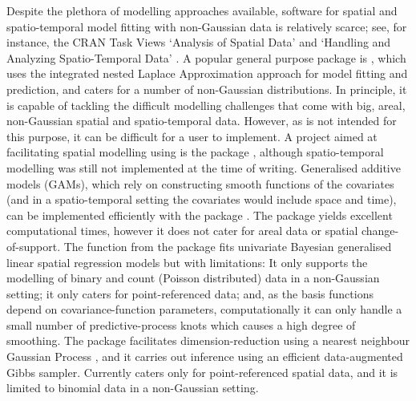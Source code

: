 \documentclass[article]{jss}
\newcommand{\fct}[1]{\code{#1()}}
\begin{document}
Despite the plethora of modelling approaches available, software for spatial and spatio-temporal model fitting with non-Gaussian data is relatively scarce; see, for instance, the CRAN Task Views `Analysis of Spatial Data' \citep{CRAN_Task_View:spatial} and `Handling and Analyzing Spatio-Temporal Data' \citep{CRAN_Task_View:spatio-temporal}. 
A popular general purpose  package is  \citep{Lindgren_2015_R-INLA}, which uses the integrated nested Laplace Approximation \citep{Rue_2009_INLA} approach for model fitting and prediction, and caters for a number of non-Gaussian distributions. 
In principle, it is capable of tackling the difficult modelling challenges that come with big, areal, non-Gaussian spatial and spatio-temporal data. However, as  is not intended for this purpose, it can be difficult for a user to implement. 
A project aimed at facilitating spatial modelling using  is the  package \citep{Bachl_2019_inlabru}, although spatio-temporal modelling was still not implemented at the time of writing.
Generalised additive models (GAMs), which rely on constructing smooth functions of the covariates (and in a spatio-temporal setting the covariates would include space and time),  can be implemented efficiently with the package  \citep{Wood_2017_GAM:R}. 
The package yields excellent computational times, however it does not cater for areal data or spatial change-of-support.
The function \fct{spGLM} from the package  \citep{Finley_2015_spBayes} fits univariate Bayesian generalised linear spatial regression models but with limitations: It only supports the modelling of binary and count (Poisson distributed) data in a non-Gaussian setting; it only caters for point-referenced data; and, as the basis functions depend on covariance-function parameters, computationally it can only handle a small number of predictive-process knots which causes a high degree of smoothing.
The package  \citep{Finley_2020_spNNGP} facilitates dimension-reduction using a nearest neighbour Gaussian Process \citep{Datta_2016_NNGP_spatial}, and it carries out inference using an efficient data-augmented Gibbs sampler. 
 Currently  caters only for point-referenced spatial data, and it is limited to binomial data in a non-Gaussian setting. 
 
 
\end{document}
